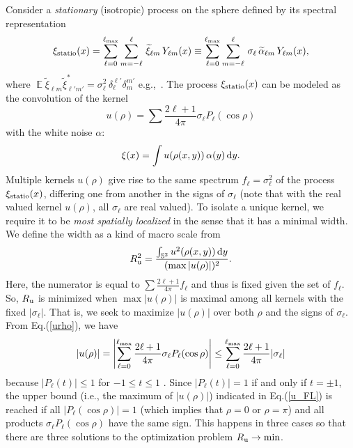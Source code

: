 \documentclass[12pt]{article}
\DeclareMathOperator{\Ex}{\mathbb{E}}
\renewcommand{\S}{{\mathbb S}}
\renewcommand{\d}{{\rm d}}
\newcommand{\eg}{e.g.,\ }
\newcommand{\ie}{i.e., }
\begin{document}
Consider a {\em stationary} (isotropic) process on the sphere
defined by its  spectral representation
%
\begin {equation}
\label{xi_statio_spe}
\xi_{\rm statio} (x) = \sum^{\ell_{\rm max}}_{\ell=0} \sum^\ell_{m=-\ell} \,\widetilde\xi_{\ell m} \, Y_{\ell m} (x) \equiv
                       \sum^{\ell_{\rm max}}_{\ell=0} \sum^\ell_{m=-\ell} \,\sigma_\ell  \,\widetilde\alpha_{\ell m} \, Y_{\ell m} (x),
\end {equation}
%
where 
$
\Ex \widetilde\xi_{\ell m} \widetilde\xi_{\ell' m'}^* = \sigma_\ell^2 \, \delta_\ell^{\ell'} \delta_{m}^{m'}
$
\eg \citet[][section 5.1]{yadrenko}.
The process  $\xi_{\rm statio}(x)$ can be modeled as 
the convolution of the kernel  
%
\begin {equation}
\label{urho}
u(\rho) = \sum \frac{2\ell +1}{4\pi} \sigma_\ell P_\ell(\cos\rho)
\end {equation}
%
with the white noise $\alpha$:
%
\begin {equation}
\label{xi_statio}
\xi(x) = \int u(\rho(x,y)) \,\alpha(y) \,\d y.
\end {equation}
%
Multiple kernels $u(\rho)$ give rise to the same  spectrum $f_\ell = \sigma_\ell^2$ of the process $\xi_{\rm statio}(x)$,
 differing one from  another in the signs of $\sigma_\ell$
 (note that with the real valued kernel $u(\rho)$, all $\sigma_\ell$ are real valued).
To isolate a unique kernel, we require it to be {\em most spatially localized} in the sense
that it has a minimal width. We define the width as a kind of macro scale from 
%
\begin {equation}
\label{R_S2}
R^2_{\rm u} = \frac {\int_{\S^2} u^2(\rho(x,y)) \,\d y} {(\max |u(\rho)|)^2}.
\end {equation}
%
Here, the numerator is equal to $ \sum \frac{2\ell +1}{4\pi} f_\ell$ and thus is fixed given the set of $f_\ell$.
So, $R_{\rm u}$ is minimized when  $\max |u(\rho)|$ is maximal among all kernels with the fixed $|\sigma_\ell|$.
That is, we seek to maximize $|u(\rho)|$ over both $\rho$ and the signs of $\sigma_\ell$.
From Eq.(\ref{urho}), we have
%
\begin {equation}
\label{u_FL}
|u(\rho)| =  \left|  \sum^{\ell_{\rm max}}_{\ell=0} \frac{2\ell +1}{4\pi}  \sigma_\ell P_\ell(\cos \rho) \right| \le
             \sum^{\ell_{\rm max}}_{\ell=0} \frac{2\ell +1}{4\pi}  |\sigma_\ell|
\end {equation}
%
because $|P_\ell(t)| \le 1$ for $-1\le t \le 1$
\citep[][section 7.21]{Szego}.
Since $|P_\ell(t)| = 1$ if and only if $t = \pm 1$,
the upper bound (\ie the maximum of  $|u(\rho)|$) indicated in Eq.(\ref{u_FL}) is 
reached if all $|P_\ell(\cos \rho)|=1$ (which implies that $\rho=0$ or $\rho=\pi$)
and all products  $\sigma_\ell P_\ell(\cos \rho)$ have the same sign.
This happens in three cases so that there are three solutions to the optimization problem $R_{\rm u} \to \min$.
\end{document}
